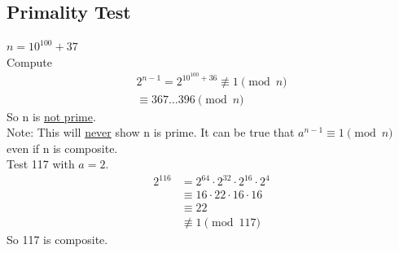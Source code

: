     \subsection{Primality Test}
    $n=10^{100}+37$ \\
    Compute 
    \begin{align*} 
        2^{n-1} = 2^{10^{100}+36}\not\equiv 1\pmod{n} \\
        \equiv 367\dots 396\pmod{n}
    \end{align*}
    So n is \underline{not prime}. \\
    Note: This will \underline{never} show n is prime. It can be true that $a^{n-1}\equiv 1\pmod{n}$
    even if n is composite. \\
    Test 117 with $a=2$. 
    \begin{align*}
        2^{116} &= 2^{64}\cdot 2^{32}\cdot 2^{16}\cdot 2^{4} \\
        &\equiv 16\cdot 22 \cdot 16 \cdot 16 \\
        &\equiv 22 \\
        &\not\equiv 1\pmod{117}
    \end{align*}
    So 117 is composite.     
